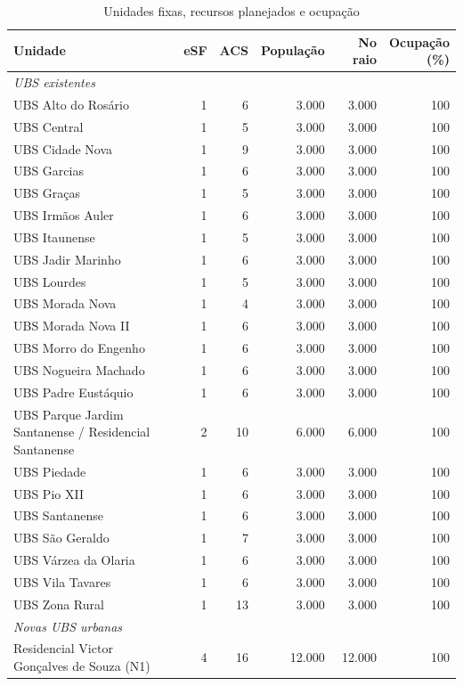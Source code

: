 \begin{table}[htbp]\centering\small\setlength{\tabcolsep}{3pt}
\caption{Unidades fixas, recursos planejados e ocupação}\label{tab:unidades}
\begin{tabular}{p{.39\linewidth}rrrrr}
\toprule Unidade & eSF & ACS & População & No raio & \shortstack{Ocupação\\(\%)}\\\midrule
\multicolumn{6}{l}{\textit{UBS existentes}}\\
UBS Alto do Rosário & 1 & 6 & 3.000 & 3.000 & 100\\
UBS Central & 1 & 5 & 3.000 & 3.000 & 100\\
UBS Cidade Nova & 1 & 9 & 3.000 & 3.000 & 100\\
UBS Garcias & 1 & 6 & 3.000 & 3.000 & 100\\
UBS Graças & 1 & 5 & 3.000 & 3.000 & 100\\
UBS Irmãos Auler & 1 & 6 & 3.000 & 3.000 & 100\\
UBS Itaunense & 1 & 5 & 3.000 & 3.000 & 100\\
UBS Jadir Marinho & 1 & 6 & 3.000 & 3.000 & 100\\
UBS Lourdes & 1 & 5 & 3.000 & 3.000 & 100\\
UBS Morada Nova & 1 & 4 & 3.000 & 3.000 & 100\\
UBS Morada Nova II & 1 & 6 & 3.000 & 3.000 & 100\\
UBS Morro do Engenho & 1 & 6 & 3.000 & 3.000 & 100\\
UBS Nogueira Machado & 1 & 6 & 3.000 & 3.000 & 100\\
UBS Padre Eustáquio & 1 & 6 & 3.000 & 3.000 & 100\\
UBS Parque Jardim Santanense / Residencial Santanense & 2 & 10 & 6.000 & 6.000 & 100\\
UBS Piedade & 1 & 6 & 3.000 & 3.000 & 100\\
UBS Pio XII & 1 & 6 & 3.000 & 3.000 & 100\\
UBS Santanense & 1 & 6 & 3.000 & 3.000 & 100\\
UBS São Geraldo & 1 & 7 & 3.000 & 3.000 & 100\\
UBS Várzea da Olaria & 1 & 6 & 3.000 & 3.000 & 100\\
UBS Vila Tavares & 1 & 6 & 3.000 & 3.000 & 100\\
UBS Zona Rural & 1 & 13 & 3.000 & 3.000 & 100\\
\midrule
\multicolumn{6}{l}{\textit{Novas UBS urbanas}}\\
Residencial Victor Gonçalves de Souza (N1) & 4 & 16 & 12.000 & 12.000 & 100\\

\end{tabular}
\end{table}
